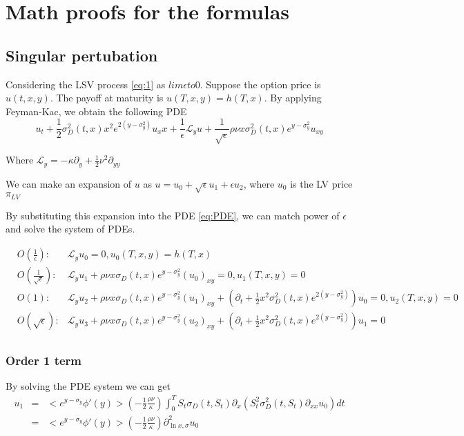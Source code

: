 \documentclass[12pt]{article}
\numberwithin{equation}{section}
\begin{document}
\section{Math proofs for the formulas}

\subsection{Singular pertubation}
Considering the LSV process \ref{eq:1} as $lim{\epsilon to 0}$. 
Suppose the option price is $u(t,x,y)$. The payoff at maturity is $ u(T,x,y)=h(T,x)$.
By applying Feyman-Kac, we obtain the following PDE
\begin{equation}\label{eq:PDE}
    u_t+\frac 1 2 \sigma_D^2(t,x)x^2e^{2(y-\sigma_y^2)}u_xx+\frac{1}{\epsilon}\mathcal{L}_y u
    +\frac{1}{\sqrt{\epsilon}}\rho \nu x \sigma_D^2(t,x)e^{y-\sigma_y^2} u_{xy}
\end{equation}

Where $\mathcal{L}_y=-\kappa \partial_y +\frac 1 2 \nu^2 \partial_{yy}$

We can make an expansion of $u$ as $u=u_0+\sqrt{\epsilon}u_1+\epsilon u_2$, where $u_0$ is the LV price $\pi_{LV}$

By substituting this expansion into the PDE \ref{eq:PDE}, we can match power of $\epsilon$
and solve the system of PDEs.

\begin{eqnarray*} 
&O(\frac{1}{\epsilon}): &\mathcal{L}_y u_0=0  , u_0(T,x,y)=h(T,x)\\
&O(\frac{1}{\sqrt\epsilon}): &\mathcal{L}_y u_1 +\rho \nu x \sigma_D(t,x)e^{y-\sigma_y^2}(u_0)_{xy}=0 , u_1(T,x,y)=0\\
&O(1): &\mathcal{L}_y u_2 +\rho \nu x \sigma_D(t,x)e^{y-\sigma_y^2}(u_1)_{xy}+(\partial_t+\frac 1 2 x^2 \sigma^2_D(t,x)e^{2(y-\sigma_y^2)})u_0=0 , u_2(T,x,y)=0\\
&O(\sqrt\epsilon): &\mathcal{L}_y u_3 +\rho \nu x \sigma_D(t,x)e^{y-\sigma_y^2}(u_2)_{xy}+(\partial_t+\frac 1 2 x^2 \sigma^2_D(t,x)e^{2(y-\sigma_y^2)})u_1=0 \\
\end{eqnarray*} 

\subsubsection{Order 1 term}
By solving the PDE system we can get 
\begin{eqnarray*} 
    u_1&=&<e^{y-\sigma_y}\phi'(y)>(-\frac 1 2 \frac{\rho \nu}{\kappa})\int_0^T S_t \sigma_D(t,S_t)\partial_x(S_t^2 \sigma_D^2(t,S_t) \partial_{xx} u_0)dt\\
    &=&<e^{y-\sigma_y}\phi'(y)>(-\frac 1 2 \frac{\rho \nu}{\kappa}) \partial^2_{\ln x, \sigma} u_0
\end{eqnarray*} 
\end{document}
